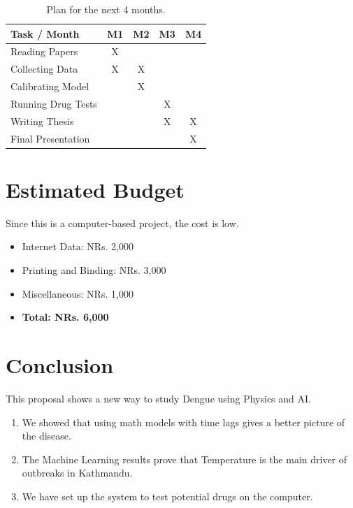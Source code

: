 \documentclass[12pt, a4paper]{article}
\begin{document}
\begin{table}[H]
\centering
\renewcommand{\arraystretch}{1.5}
\begin{tabular}{|l|c|c|c|c|}
\hline
\textbf{Task / Month} & \textbf{M1} & \textbf{M2} & \textbf{M3} & \textbf{M4} \\ \hline
Reading Papers & X & & & \\ \hline
Collecting Data & X & X & & \\ \hline
Calibrating Model & & X & & \\ \hline
Running Drug Tests & & & X & \\ \hline
Writing Thesis & & & X & X \\ \hline
Final Presentation & & & & X \\ \hline
\end{tabular}
\caption{Plan for the next 4 months.}
\end{table}

\section{Estimated Budget}
Since this is a computer-based project, the cost is low.
\begin{itemize}
    \item Internet Data: NRs. 2,000
    \item Printing and Binding: NRs. 3,000
    \item Miscellaneous: NRs. 1,000
    \item \textbf{Total: NRs. 6,000}
\end{itemize}

\newpage

\section{Conclusion}

This proposal shows a new way to study Dengue using Physics and AI.
\begin{enumerate}
    \item We showed that using math models with time lags gives a better picture of the disease.
    \item The Machine Learning results prove that Temperature is the main driver of outbreaks in Kathmandu.
    \item We have set up the system to test potential drugs on the computer.
\end{enumerate}
\end{document}
